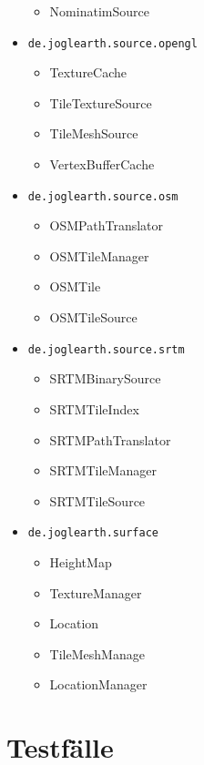 \documentclass[10pt]{scrreprt}
\begin{document}
\begin{itemize}
\begin{itemize}
 \item NominatimSource
 \end{itemize}
 \item \texttt{de.joglearth.source.opengl}
 \begin{itemize}
 \item TextureCache
 \item TileTextureSource
 \item TileMeshSource
 \item VertexBufferCache
 \end{itemize}
 \item \texttt{de.joglearth.source.osm}
 \begin{itemize}
 \item OSMPathTranslator
 \item OSMTileManager
 \item OSMTile
 \item OSMTileSource
 \end{itemize}
 \item \texttt{de.joglearth.source.srtm}
 \begin{itemize}
 \item SRTMBinarySource
 \item SRTMTileIndex
 \item SRTMPathTranslator
 \item SRTMTileManager
 \item SRTMTileSource
 \end{itemize}
 \item \texttt{de.joglearth.surface}
 \begin{itemize}
 \item HeightMap
 \item TextureManager
 \item Location
 \item TileMeshManage
 \item LocationManager
 \end{itemize}
\end{itemize}

\newpage
\section{Testfälle}
\end{document}

